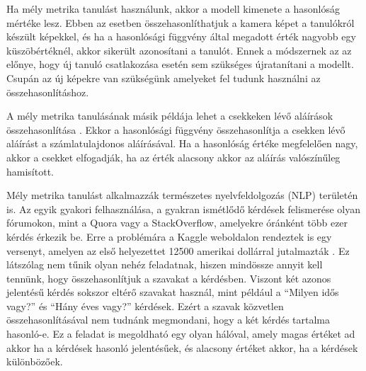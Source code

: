 Ha mély metrika tanulást használunk, akkor a modell kimenete a hasonlóság mértéke lesz. Ebben az esetben összehasonlíthatjuk a kamera képet a tanulókról készült képekkel, és ha a hasonlósági függvény által megadott érték nagyobb egy küszöbértéknél, akkor sikerült azonosítani a tanulót. Ennek a módszernek az az előnye, hogy új tanuló csatlakozása esetén sem szükséges újratanítani a modellt. Csupán az új képekre van szükségünk amelyeket fel tudunk használni az összehasonlításhoz.


A mély metrika tanulásának másik példája lehet a csekkeken lévő aláírások összehasonlítása \cite{soleimani2016signature}. Ekkor a hasonlósági függvény összehasonlítja a csekken lévő aláírást a számlatulajdonos aláírásával. Ha a hasonlóság értéke megfelelően nagy, akkor a csekket elfogadják, ha az érték alacsony akkor az aláírás valószínűleg hamisított.


Mély metrika tanulást alkalmazzák természetes nyelvfeldolgozás (NLP) területén is. Az egyik gyakori felhasználása, a gyakran ismétlődő kérdések felismerése olyan fórumokon, mint a Quora vagy a StackOverflow, amelyekre óránként több ezer kérdés érkezik be. Erre a problémára a Kaggle weboldalon rendeztek is egy versenyt, amelyen az első helyezettet 12500 amerikai dollárral jutalmazták \cite{kaggle}. Ez látszólag nem tűnik olyan nehéz feladatnak, hiszen mindössze annyit kell tennünk, hogy összehasonlítjuk a szavakat a kérdésben. Viszont két azonos jelentésű kérdés sokszor eltérő szavakat használ, mint például a ``Milyen idős vagy?'' és ``Hány éves vagy?'' kérdések. Ezért a szavak közvetlen összehasonlításával nem tudnánk megmondani, hogy a két kérdés tartalma hasonló-e. Ez a feladat is megoldható egy olyan hálóval, amely magas értéket ad akkor ha a kérdések hasonló jelentésűek, és alacsony értéket akkor, ha a kérdések különbözőek.

